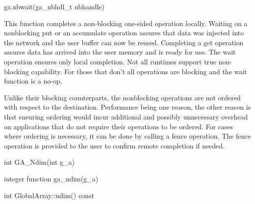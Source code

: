 \documentclass[12pt]{article}
\begin{document}
\begin{pyapi}
\begin{pycode}
ga.nbwait(ga_nbhdl_t nbhandle)
\end{pycode}
\end{pyapi}

\ncoll

\begin{desc}
This function completes a non-blocking one-sided operation locally. Waiting on
a nonblocking put or an accumulate operation assures that data was injected
into the network and the user buffer can now be reused. Completing a get
operation assures data has arrived into the user memory and is ready for use.
The wait operation ensures only local completion. Not all runtimes support true
non-blocking capability. For those that don't all operations are blocking and
the wait function is a no-op.

Unlike their blocking counterparts, the nonblocking operations are not ordered
with respect to the destination. Performance being one reason, the other reason
is that ensuring ordering would incur additional and possibly unnecessary
overhead on applications that do not require their operations to be ordered.
For cases where ordering is necessary, it can be done by calling a fence
operation. The fence operation is provided to the user to confirm remote
completion if needed.
\end{desc}



\begin{capi}
\begin{ccode}
int GA_Ndim(int g_a)
\end{ccode}
\begin{funcargs}
\end{funcargs}
\end{capi}

\begin{fapi}
\begin{fcode}
integer function ga_ndim(g_a)
\end{fcode}
\begin{funcargs}
\end{funcargs}
\end{fapi}

\begin{cxxapi}
\begin{cxxcode}
int GlobalArray::ndim() const
\end{cxxcode}
\end{cxxapi}
\end{document}
